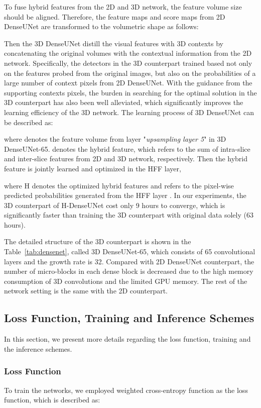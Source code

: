 \documentclass[journal]{IEEEtran}
\begin{document}
To fuse hybrid features from the 2D and 3D network, the feature volume size should be aligned. Therefore, the feature maps and score maps from 2D DenseUNet are transformed to the volumetric shape as follows:

Then the 3D DenseUNet distill the visual features with 3D contexts by concatenating the original volumes  with the contextual information  from the 2D network.
Specifically, the detectors in the 3D counterpart trained based not only on the features probed from the original images, but also on the probabilities of a large number of context pixels from 2D DenseUNet. With the guidance from the supporting contexts pixels, the burden in searching for the optimal solution in the 3D counterpart has also been well alleviated, which significantly improves the learning efficiency of the 3D network.
The learning process of 3D DenseUNet can be described as:

where  denotes the feature volume from layer "\emph{upsampling layer 5}" in 3D DenseUNet-65.  denotes the hybrid feature, which refers to the sum of intra-slice and inter-slice features from 2D and 3D network, respectively. Then the hybrid feature is jointly learned and optimized in the HFF layer,

where H denotes the optimized hybrid features and  refers to the pixel-wise predicted probabilities generated from the HFF layer .
In our experiments, the 3D counterpart of H-DenseUNet cost only 9 hours to converge, which is significantly faster than training the 3D counterpart with original data solely (63 hours).

The detailed structure of the 3D counterpart is shown in the Table~\ref{tab:densenet}, called 3D DenseUNet-65, which consists of 65 convolutional layers and the growth rate is 32.
Compared with 2D DenseUNet counterpart, the number of micro-blocks in each dense block is decreased due to the high memory consumption of 3D convolutions and the limited GPU memory.
The rest of the network setting is the same with the 2D counterpart.


\subsection{Loss Function, Training and Inference Schemes}
In this section, we present more details regarding the loss function, training and the inference schemes.


\subsubsection{Loss Function}
To train the networks, we employed weighted cross-entropy function as the loss function, which is described as:
\end{document}
